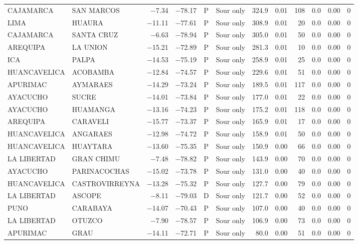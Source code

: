 \begin{landscape}
\begin{longtable}{llrrclrrrrrr}
CAJAMARCA & SAN MARCOS & $-$7.34 & $-$78.17 & P & Sour only & 324.9 & 0.01 & 108 & 0.0 & 0.00 & 0 \\
LIMA & HUAURA & $-$11.11 & $-$77.61 & P & Sour only & 308.9 & 0.01 & 20 & 0.0 & 0.00 & 0 \\
CAJAMARCA & SANTA CRUZ & $-$6.63 & $-$78.94 & P & Sour only & 305.0 & 0.01 & 50 & 0.0 & 0.00 & 0 \\
AREQUIPA & LA UNION & $-$15.21 & $-$72.89 & P & Sour only & 281.3 & 0.01 & 10 & 0.0 & 0.00 & 0 \\
ICA & PALPA & $-$14.53 & $-$75.19 & P & Sour only & 258.9 & 0.01 & 25 & 0.0 & 0.00 & 0 \\
HUANCAVELICA & ACOBAMBA & $-$12.84 & $-$74.57 & P & Sour only & 229.6 & 0.01 & 51 & 0.0 & 0.00 & 0 \\
APURIMAC & AYMARAES & $-$14.29 & $-$73.24 & P & Sour only & 189.5 & 0.01 & 117 & 0.0 & 0.00 & 0 \\
AYACUCHO & SUCRE & $-$14.01 & $-$73.84 & P & Sour only & 177.0 & 0.01 & 22 & 0.0 & 0.00 & 0 \\
AYACUCHO & HUAMANGA & $-$13.16 & $-$74.23 & P & Sour only & 175.2 & 0.01 & 118 & 0.0 & 0.00 & 0 \\
AREQUIPA & CARAVELI & $-$15.77 & $-$73.37 & P & Sour only & 165.9 & 0.01 & 17 & 0.0 & 0.00 & 0 \\
HUANCAVELICA & ANGARAES & $-$12.98 & $-$74.72 & P & Sour only & 158.9 & 0.01 & 50 & 0.0 & 0.00 & 0 \\
HUANCAVELICA & HUAYTARA & $-$13.60 & $-$75.35 & P & Sour only & 150.9 & 0.00 & 66 & 0.0 & 0.00 & 0 \\
LA LIBERTAD & GRAN CHIMU & $-$7.48 & $-$78.82 & P & Sour only & 143.9 & 0.00 & 70 & 0.0 & 0.00 & 0 \\
AYACUCHO & PARINACOCHAS & $-$15.02 & $-$73.78 & P & Sour only & 131.0 & 0.00 & 40 & 0.0 & 0.00 & 0 \\
HUANCAVELICA & CASTROVIRREYNA & $-$13.28 & $-$75.32 & P & Sour only & 127.7 & 0.00 & 79 & 0.0 & 0.00 & 0 \\
LA LIBERTAD & ASCOPE & $-$8.11 & $-$79.03 & D & Sour only & 121.7 & 0.00 & 52 & 0.0 & 0.00 & 0 \\
PUNO & CARABAYA & $-$14.07 & $-$70.43 & P & Sour only & 107.0 & 0.00 & 40 & 0.0 & 0.00 & 0 \\
LA LIBERTAD & OTUZCO & $-$7.90 & $-$78.57 & P & Sour only & 106.9 & 0.00 & 73 & 0.0 & 0.00 & 0 \\
APURIMAC & GRAU & $-$14.11 & $-$72.71 & P & Sour only & 80.0 & 0.00 & 51 & 0.0 & 0.00 & 0 \\

\end{longtable}
\end{landscape}
